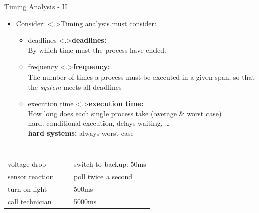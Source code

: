 \documentclass[ngerman={babel}, utf8, bigger, t, xcolor={table,dvipsnames}, ompress, hyperref={bookmarks,colorlinks},red]{beamer}
\begin{document}
\begin{frame}{Timing Analysis - II}
	\begin{itemize}
		\item Consider:
		\note<.>{Timing analysis must consider:}
		\begin{itemize}
			\item deadlines
			\note<.>{\textbf{deadlines:}\\ By which time must the process have ended.}
			\item frequency
			\note<.>{\textbf{frequency:}\\ The number of times a process must be executed in a given span, so that the \emph{system} meets all deadlines}
			\item execution time
			\note<.>{\textbf{execution time:}\\ How long does each single process take (average \& worst case) \\ hard: conditional execution, delays waiting, \dots \\ \textbf{hard systems:} always worst case}
		\end{itemize}
	\end{itemize}
\end{frame}

\begin{frame}
	\begin{tabular}{p{9em}p{13em}}
		\rowcolor{structure.fg}\hline \textcolor{white}{Stimulus/Response} & \textcolor{white}{Timing requirements} \pause \\
		voltage drop & switch to backup: 50ms \pause \\
		sensor reaction & poll twice a second \pause \\
		turn on light & 500ms \pause \\
		call technician & 5000ms \\
	\end{tabular}
\end{frame}
\end{document}
